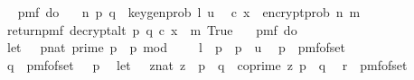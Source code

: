\begin{isabellebody}
\ \ \isamarkupfalse%
\ {\isachardoublequoteopen}pmf\ {\isacharparenleft}{\kern0pt}do\ {\isacharbraceleft}{\kern0pt}\isanewline
\ \ {\isacharparenleft}{\kern0pt}n{\isacharcomma}{\kern0pt}\ {\isacharparenleft}{\kern0pt}p{\isacharcomma}{\kern0pt}\ q{\isacharparenright}{\kern0pt}{\isacharparenright}{\kern0pt}\ {\isasymleftarrow}\ key{\isacharunderscore}{\kern0pt}gen{\isacharunderscore}{\kern0pt}prob\ l\ u{\isacharsemicolon}{\kern0pt}\isanewline
\ \ {\isacharparenleft}{\kern0pt}c{\isacharcomma}{\kern0pt}\ x{\isacharparenright}{\kern0pt}\ {\isasymleftarrow}\ {\isacharparenleft}{\kern0pt}encrypt{\isacharunderscore}{\kern0pt}prob\ n\ m{\isacharparenright}{\kern0pt}{\isacharsemicolon}{\kern0pt}\isanewline
\ \ return{\isacharunderscore}{\kern0pt}pmf\ {\isacharparenleft}{\kern0pt}decrypt{\isacharunderscore}{\kern0pt}alt\ p\ q\ {\isacharparenleft}{\kern0pt}c{\isacharcomma}{\kern0pt}\ x{\isacharparenright}{\kern0pt}\ {\isacharequal}{\kern0pt}\ m{\isacharparenright}{\kern0pt}{\isacharbraceright}{\kern0pt}{\isacharparenright}{\kern0pt}\ True\isanewline
\ \ {\isacharequal}{\kern0pt}\ pmf\ {\isacharparenleft}{\kern0pt}do\ {\isacharbraceleft}{\kern0pt}\isanewline
\ \ let\ {\isasymK}\ {\isacharequal}{\kern0pt}\ {\isacharbraceleft}{\kern0pt}{\isacharparenleft}{\kern0pt}p{\isacharcolon}{\kern0pt}{\isacharcolon}{\kern0pt}nat{\isacharparenright}{\kern0pt}{\isachardot}{\kern0pt}\ prime\ p\ {\isasymand}\ p\ mod\ {}\ {\isacharequal}{\kern0pt}\ {}\ {\isasymand}\ l\ {\isasymle}\ p\ {\isasymand}\ p\ {\isasymle}\ u{\isacharbraceright}{\kern0pt}{\isacharsemicolon}{\kern0pt}\isanewline
\ \ p\ {\isasymleftarrow}\ pmf{\isacharunderscore}{\kern0pt}of{\isacharunderscore}{\kern0pt}set\ {\isasymK}{\isacharsemicolon}{\kern0pt}\ \isanewline
\ \ q\ {\isasymleftarrow}\ pmf{\isacharunderscore}{\kern0pt}of{\isacharunderscore}{\kern0pt}set\ {\isacharparenleft}{\kern0pt}{\isasymK}\ {\isacharminus}{\kern0pt}\ {\isacharbraceleft}{\kern0pt}p{\isacharbraceright}{\kern0pt}{\isacharparenright}{\kern0pt}{\isacharsemicolon}{\kern0pt}\isanewline
\ \ let\ {\isasymZ}\ {\isacharequal}{\kern0pt}\ {\isacharbraceleft}{\kern0pt}{\isacharparenleft}{\kern0pt}z{\isacharcolon}{\kern0pt}{\isacharcolon}{\kern0pt}nat{\isacharparenright}{\kern0pt}{\isachardot}{\kern0pt}\ z\ {\isacharless}{\kern0pt}\ p\ {\isacharasterisk}{\kern0pt}\ q\ {\isasymand}\ coprime\ z\ {\isacharparenleft}{\kern0pt}p\ {\isacharasterisk}{\kern0pt}\ q{\isacharparenright}{\kern0pt}{\isacharbraceright}{\kern0pt}{\isacharsemicolon}{\kern0pt}\isanewline
\ \ r\ {\isasymleftarrow}\ pmf{\isacharunderscore}{\kern0pt}of{\isacharunderscore}{\kern0pt}set\ {\isasymZ}{\isacharsemicolon}{\kern0pt}\isanewline

\end{isabellebody}
